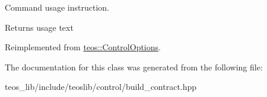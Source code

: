 Command \textquotesingle{}usage\textquotesingle{} instruction. 

\begin{DoxyReturn}{Returns}
usage text 
\end{DoxyReturn}


Reimplemented from \mbox{\hyperlink{classteos_1_1_control_options_a0aa5671f9bc750ed5280c26c543874f3}{teos\+::\+Control\+Options}}.



The documentation for this class was generated from the following file\+:\begin{DoxyCompactItemize}
\item 
teos\+\_\+lib/include/teoslib/control/build\+\_\+contract.\+hpp\end{DoxyCompactItemize}
